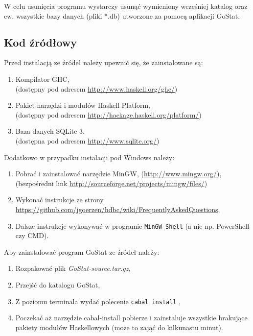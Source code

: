 \documentclass[10pt,leqno]{article}
\newcommand{\cmd}[1]{
  \texttt{#1}
}
\begin{document}
W celu usunięcia programu wystarczy usunąć wymieniony wcześniej katalog oraz ew. wszystkie bazy danych (pliki *.db) utworzone za pomocą aplikacji
GoStat.

\subsection{Kod źródłowy}
Przed instalacją ze źródeł należy upewnić się, że zainstalowane są:

\begin{enumerate}
\item Kompilator GHC, \\ (dostępny pod adresem  \url{http://www.haskell.org/ghc/})
\item Pakiet narzędzi i modułów Haskell Platform, \\ (dostępny pod adresem \url{http://hackage.haskell.org/platform/})
\item Baza danych SQLite 3. \\ (dostępna pod adresem \url{http://www.sqlite.org/})
\end{enumerate}

\noindent Dodatkowo w przypadku instalacji pod Windows należy:

\begin{enumerate}
\item Pobrać i zainstalować narzędzie MinGW, (\url{http://www.mingw.org/}), \\ (bezpośredni link \url{http://sourceforge.net/projects/mingw/files/})
\item Wykonać instrukcje ze strony \url{https://github.com/jgoerzen/hdbc/wiki/FrequentlyAskedQuestions},
\item Dalsze instrukcje wykonywać w programie \cmd{MinGW Shell} (a nie np. PowerShell czy CMD).
\end{enumerate}


\noindent Aby zainstalować program GoStat ze źródeł należy:

\begin{enumerate}
\item Rozpakować plik \emph{GoStat-source.tar.gz},
\item Przejść do katalogu GoStat,
\item Z poziomu terminala wydać polecenie \cmd{cabal install},
\item Poczekać aż narzędzie cabal-install pobierze i zainstaluje wszystkie brakujące pakiety modułów Haskellowych (może to zająć do kilkunastu minut).
\end{enumerate}
\end{document}
